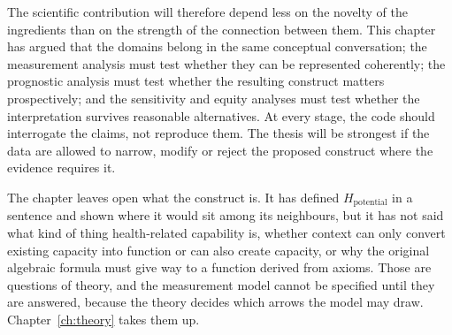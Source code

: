 The scientific contribution will therefore depend less on the novelty of the ingredients than on the strength of the connection between them. This chapter has argued that the domains belong in the same conceptual conversation; the measurement analysis must test whether they can be represented coherently; the prognostic analysis must test whether the resulting construct matters prospectively; and the sensitivity and equity analyses must test whether the interpretation survives reasonable alternatives. At every stage, the code should interrogate the claims, not reproduce them. The thesis will be strongest if the data are allowed to narrow, modify or reject the proposed construct where the evidence requires it.

The chapter leaves open what the construct is. It has defined $H_{\text{potential}}$ in a sentence and shown where it would sit among its neighbours, but it has not said what kind of thing health-related capability is, whether context can only convert existing capacity into function or can also create capacity, or why the original algebraic formula must give way to a function derived from axioms. Those are questions of theory, and the measurement model cannot be specified until they are answered, because the theory decides which arrows the model may draw. Chapter~\ref{ch:theory} takes them up.
